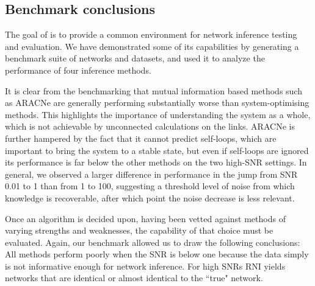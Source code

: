\subsection{Benchmark conclusions}
\label{sec:orgheadline8}
The goal of \gs is to provide a common environment for network inference testing and evaluation. We have demonstrated some of its capabilities by generating a benchmark suite of networks and datasets, and used it to analyze the performance of four inference methods.  

It is clear from the benchmarking that mutual information based methods such as ARACNe are generally performing substantially worse than system-optimising methods. This highlights the importance of understanding the system as a whole, which is not achievable by unconnected calculations on the links. ARACNe is further hampered by the fact that it cannot predict self-loops, which are important to bring the system to a stable state, but even if self-loops are ignored its performance is far below the other methods on the two high-SNR settings.
In general, we observed a larger difference in performance in the jump from SNR 0.01 to 1 than from 1 to 100, suggesting a threshold level of noise from which knowledge is recoverable, after which point the noise decrease is less relevant.

Once an algorithm is decided upon, having been vetted against methods of varying strengths and weaknesses, the capability of that choice must be evaluated. Again, our benchmark allowed us to draw the following conclusions:
All methods perform poorly when the SNR is below one because the data simply is not informative enough for network inference.
For high SNRs RNI yields networks that are identical or almost identical to the ``true" network.